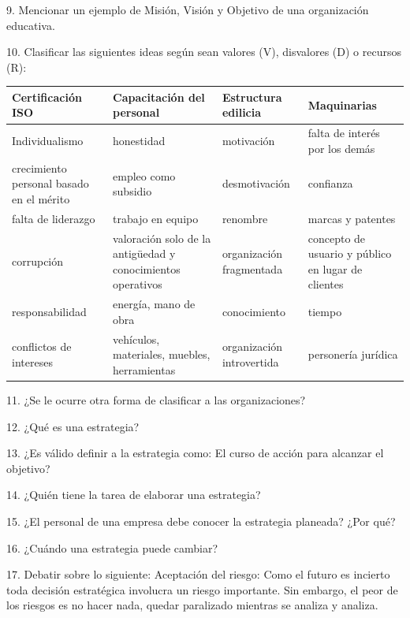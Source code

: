 9. Mencionar un ejemplo de Misión, Visión y Objetivo de una organización educativa.

10. Clasificar las siguientes ideas según sean valores (V), disvalores (D) o recursos (R):


\begin{center}
\small
\begin{tabular}{|p{}|p{}|p{}|p{}|}
\hline
Certificación ISO & Capacitación del personal & Estructura edilicia & Maquinarias \\ \hline
Individualismo & honestidad & motivación & falta de interés por los demás \\ \hline
crecimiento personal basado en el mérito & empleo como subsidio & desmotivación & confianza \\ \hline
falta de liderazgo & trabajo en equipo & renombre & marcas y patentes \\ \hline
corrupción & valoración solo de la antigüedad y conocimientos operativos & organización fragmentada & concepto de usuario y público en lugar de clientes \\ \hline
responsabilidad & energía, mano de obra & conocimiento & tiempo \\ \hline
conflictos de intereses & vehículos, materiales, muebles, herramientas & organización introvertida & personería jurídica \\ \hline
\end{tabular}
\end{center}

11. ¿Se le ocurre otra forma de clasificar a las organizaciones?

12. ¿Qué es una estrategia?

13. ¿Es válido definir a la estrategia como: El curso de acción para alcanzar el objetivo?

14. ¿Quién tiene la tarea de elaborar una estrategia?

15. ¿El personal de una empresa debe conocer la estrategia planeada? ¿Por qué?

16. ¿Cuándo una estrategia puede cambiar?

17. Debatir sobre lo siguiente: Aceptación del riesgo: Como el futuro es incierto toda decisión estratégica involucra un riesgo importante. Sin embargo, el peor de los riesgos es no hacer nada, quedar paralizado mientras se analiza y analiza.

